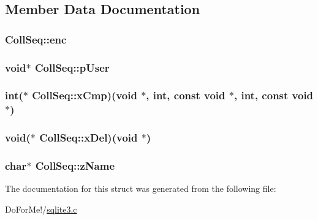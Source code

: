 \subsection{Member Data Documentation}
\hypertarget{struct_coll_seq_add27da1a70ed6f538447e9183eeb4838}{
\subsubsection[{enc}]{ Coll\-Seq\-::enc}}\label{struct_coll_seq_add27da1a70ed6f538447e9183eeb4838}
\hypertarget{struct_coll_seq_a3cee924d41e730ccec7f686eb5b6f041}{
\subsubsection[{p\-User}]{\setlength{\rightskip}{0pt plus 5cm}void$\ast$ Coll\-Seq\-::p\-User}}\label{struct_coll_seq_a3cee924d41e730ccec7f686eb5b6f041}
\hypertarget{struct_coll_seq_a47fc6d3a01eee354332ca515a8b493ce}{
\subsubsection[{x\-Cmp}]{\setlength{\rightskip}{0pt plus 5cm}int($\ast$ Coll\-Seq\-::x\-Cmp)(void $\ast$, int, const void $\ast$, int, const void $\ast$)}}\label{struct_coll_seq_a47fc6d3a01eee354332ca515a8b493ce}
\hypertarget{struct_coll_seq_a1c0dd3ad98c7bb2ef517f9170134a125}{
\subsubsection[{x\-Del}]{\setlength{\rightskip}{0pt plus 5cm}void($\ast$ Coll\-Seq\-::x\-Del)(void $\ast$)}}\label{struct_coll_seq_a1c0dd3ad98c7bb2ef517f9170134a125}
\hypertarget{struct_coll_seq_a48d6d5f71d4f8a3ab122903464e8b4a1}{
\subsubsection[{z\-Name}]{\setlength{\rightskip}{0pt plus 5cm}char$\ast$ Coll\-Seq\-::z\-Name}}\label{struct_coll_seq_a48d6d5f71d4f8a3ab122903464e8b4a1}


The documentation for this struct was generated from the following file\-:\begin{DoxyCompactItemize}
\item 
Do\-For\-Me!/\hyperlink{sqlite3_8c}{sqlite3.\-c}\end{DoxyCompactItemize}
